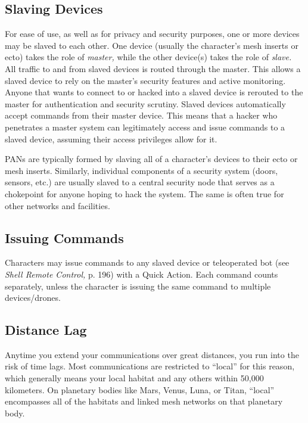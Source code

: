 \subsection{Slaving Devices} 



For ease of use, as well as for privacy and security purposes, one or more devices may be slaved to each other. One device (usually the character's mesh inserts or ecto) takes the role of \textit{master,} while the other device(s) takes the role of \textit{slave.} All traffic to and from slaved devices is routed through the master. This allows a slaved device to rely on the master's security features and active monitoring. Anyone that wants to connect to or hacked into a slaved device is rerouted to the master for authentication and security scrutiny. Slaved devices automatically accept commands from their master device. This means that a hacker who penetrates a master system can legitimately access and issue commands to a slaved device, assuming their access privileges allow for it. 

PANs are typically formed by slaving all of a character's devices to their ecto or mesh inserts. Similarly, individual components of a security system (doors, sensors, etc.) are usually slaved to a central security node that serves as a chokepoint for anyone hoping to hack the system. The same is often true for other networks and facilities. 

\subsection{Issuing Commands} 

Characters may issue commands to any slaved device or teleoperated bot (see \textit{Shell Remote Control,} p. 196) with a Quick Action. Each command counts separately, unless the character is issuing the same command to multiple devices/drones. 

\subsection{Distance Lag} 

Anytime you extend your communications over great distances, you run into the risk of time lags. Most communications are restricted to ``local'' for this reason, which generally means your local habitat and any others within 50,000 kilometers. On planetary bodies like Mars, Venus, Luna, or Titan, ``local'' encompasses all of the habitats and linked mesh networks on that planetary body. 

